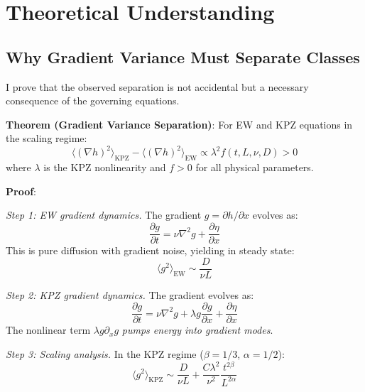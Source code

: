 \documentclass[aps,pre,twocolumn,superscriptaddress,showpacs]{revtex4-2}
\begin{document}
\section{Theoretical Understanding}
\label{sec:theory}

\subsection{Why Gradient Variance Must Separate Classes}

I prove that the observed separation is not accidental but a necessary consequence of the governing equations.

\textbf{Theorem (Gradient Variance Separation)}: For EW and KPZ equations in the scaling regime:
\begin{equation}
\langle (\nabla h)^2 \rangle_{\text{KPZ}} - \langle (\nabla h)^2 \rangle_{\text{EW}} \propto \lambda^2 f(t, L, \nu, D) > 0
\label{eq:theorem}
\end{equation}
where $\lambda$ is the KPZ nonlinearity and $f > 0$ for all physical parameters.

\textbf{Proof}:

\emph{Step 1: EW gradient dynamics.} The gradient $g = \partial h/\partial x$ evolves as:
\begin{equation}
\frac{\partial g}{\partial t} = \nu \nabla^2 g + \frac{\partial \eta}{\partial x}
\end{equation}
This is pure diffusion with gradient noise, yielding in steady state:
\begin{equation}
\langle g^2 \rangle_{\text{EW}} \sim \frac{D}{\nu L}
\end{equation}

\emph{Step 2: KPZ gradient dynamics.} The gradient evolves as:
\begin{equation}
\frac{\partial g}{\partial t} = \nu \nabla^2 g + \lambda g \frac{\partial g}{\partial x} + \frac{\partial \eta}{\partial x}
\end{equation}
The nonlinear term $\lambda g \partial_x g$ \emph{pumps energy into gradient modes}.

\emph{Step 3: Scaling analysis.} In the KPZ regime ($\beta = 1/3$, $\alpha = 1/2$):
\begin{equation}
\langle g^2 \rangle_{\text{KPZ}} \sim \frac{D}{\nu L} + \frac{C\lambda^2}{\nu^2} \frac{t^{2\beta}}{L^{2\alpha}}
\end{equation}
\end{document}
